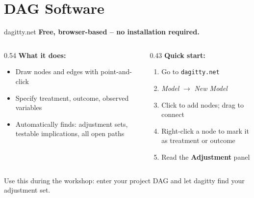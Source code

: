 
\section{DAG Software}

\begin{frame}{dagitty.net}
  \textbf{Free, browser-based -- no installation required.}

  \vspace{8pt}

  \begin{columns}[T]
    \begin{column}{0.54\textwidth}
      \textbf{What it does:}
      \begin{itemize}
        \item Draw nodes and edges with point-and-click
        \item Specify treatment, outcome, observed variables
        \item Automatically finds: adjustment sets, testable implications, all open paths
      \end{itemize}
    \end{column}
    \begin{column}{0.43\textwidth}
      \textbf{Quick start:}
      \begin{enumerate}
        \item Go to \texttt{dagitty.net}
        \item \textit{Model} $\to$ \textit{New Model}
        \item Click to add nodes; drag to connect
        \item Right-click a node to mark it as treatment or outcome
        \item Read the \textbf{Adjustment} panel
      \end{enumerate}
    \end{column}
  \end{columns}

  \vspace{8pt}

  Use this during the workshop: enter your project DAG and let dagitty find your adjustment set.
\end{frame}

